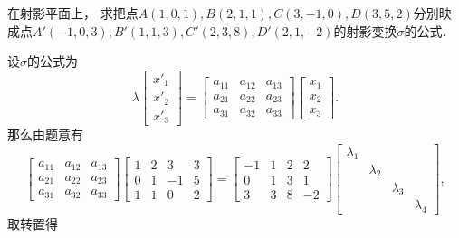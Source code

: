 \begin{example}
在射影平面上，
求把点\(
	A(1,0,1),
	B(2,1,1),
	C(3,-1,0),
	D(3,5,2)
\)分别映成点\(
	A'(-1,0,\allowbreak3),
	B'(1,1,3),
	C'(2,3,8),
	D'(2,1,-2)
\)的射影变换\(\sigma\)的公式.
\begin{solution}
设\(\sigma\)的公式为\begin{equation*}
	\lambda
	\begin{bmatrix}
		x'_1 \\ x'_2 \\ x'_3
	\end{bmatrix}
	= \begin{bmatrix}
		a_{11} & a_{12} & a_{13} \\
		a_{21} & a_{22} & a_{23} \\
		a_{31} & a_{32} & a_{33}
	\end{bmatrix}
	\begin{bmatrix}
		x_1 \\ x_2 \\ x_3
	\end{bmatrix}.
\end{equation*}
那么由题意有\begin{equation*}
	\begin{bmatrix}
		a_{11} & a_{12} & a_{13} \\
		a_{21} & a_{22} & a_{23} \\
		a_{31} & a_{32} & a_{33}
	\end{bmatrix}
	\begin{bmatrix}
		1 & 2 & 3 & 3 \\
		0 & 1 & -1 & 5 \\
		1 & 1 & 0 & 2
	\end{bmatrix}
	= \begin{bmatrix}
		-1 & 1 & 2 & 2 \\
		0 & 1 & 3 & 1 \\
		3 & 3 & 8 & -2
	\end{bmatrix}
	\begin{bmatrix}
		\lambda_1 \\
		& \lambda_2 \\
		&& \lambda_3 \\
		&&& \lambda_4
	\end{bmatrix},
\end{equation*}
取转置得\begin{equation*}

\end{equation*}
\end{solution}
\end{example}
